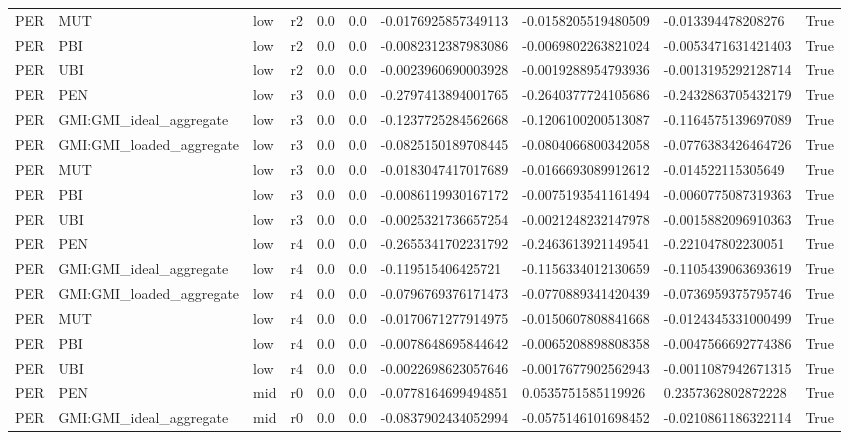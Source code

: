 \begin{table}[!htbp]
\begin{tabular}{llllllllll}
PER & MUT & low & r2 & 0.0 & 0.0 & -0.0176925857349113 & -0.0158205519480509 & -0.013394478208276 & True \\
PER & PBI & low & r2 & 0.0 & 0.0 & -0.0082312387983086 & -0.0069802263821024 & -0.0053471631421403 & True \\
PER & UBI & low & r2 & 0.0 & 0.0 & -0.0023960690003928 & -0.0019288954793936 & -0.0013195292128714 & True \\
PER & PEN & low & r3 & 0.0 & 0.0 & -0.2797413894001765 & -0.2640377724105686 & -0.2432863705432179 & True \\
PER & GMI:GMI\_ideal\_aggregate & low & r3 & 0.0 & 0.0 & -0.1237725284562668 & -0.1206100200513087 & -0.1164575139697089 & True \\
PER & GMI:GMI\_loaded\_aggregate & low & r3 & 0.0 & 0.0 & -0.0825150189708445 & -0.0804066800342058 & -0.0776383426464726 & True \\
PER & MUT & low & r3 & 0.0 & 0.0 & -0.0183047417017689 & -0.0166693089912612 & -0.014522115305649 & True \\
PER & PBI & low & r3 & 0.0 & 0.0 & -0.0086119930167172 & -0.0075193541161494 & -0.0060775087319363 & True \\
PER & UBI & low & r3 & 0.0 & 0.0 & -0.0025321736657254 & -0.0021248232147978 & -0.0015882096910363 & True \\
PER & PEN & low & r4 & 0.0 & 0.0 & -0.2655341702231792 & -0.2463613921149541 & -0.221047802230051 & True \\
PER & GMI:GMI\_ideal\_aggregate & low & r4 & 0.0 & 0.0 & -0.119515406425721 & -0.1156334012130659 & -0.1105439063693619 & True \\
PER & GMI:GMI\_loaded\_aggregate & low & r4 & 0.0 & 0.0 & -0.0796769376171473 & -0.0770889341420439 & -0.0736959375795746 & True \\
PER & MUT & low & r4 & 0.0 & 0.0 & -0.0170671277914975 & -0.0150607808841668 & -0.0124345331000499 & True \\
PER & PBI & low & r4 & 0.0 & 0.0 & -0.0078648695844642 & -0.0065208898808358 & -0.0047566692774386 & True \\
PER & UBI & low & r4 & 0.0 & 0.0 & -0.0022698623057646 & -0.0017677902562943 & -0.0011087942671315 & True \\
PER & PEN & mid & r0 & 0.0 & 0.0 & -0.0778164699494851 & 0.0535751585119926 & 0.2357362802872228 & True \\
PER & GMI:GMI\_ideal\_aggregate & mid & r0 & 0.0 & 0.0 & -0.0837902434052994 & -0.0575146101698452 & -0.0210861186322114 & True \\

\end{tabular}
\end{table}
